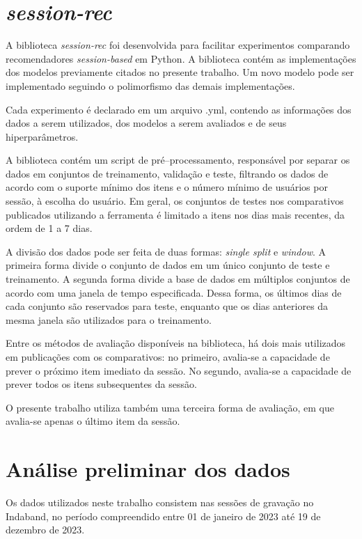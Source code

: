 \section{\textit{session-rec}} A biblioteca \textit{session-rec} foi
desenvolvida para facilitar experimentos comparando recomendadores
\textit{session-based} em Python. A biblioteca contém as implementações dos
modelos previamente citados no presente trabalho. Um novo modelo pode ser
implementado seguindo o polimorfismo das demais implementações.

Cada experimento é declarado em um arquivo .yml, contendo as informações dos
dados a serem utilizados, dos modelos a serem avaliados e de seus hiperparâmetros.

A biblioteca contém um script de pré--processamento, responsável por separar os
dados em conjuntos de treinamento, validação e teste, filtrando os dados de
acordo com o suporte mínimo dos itens e o número mínimo de usuários por sessão,
à escolha do usuário. Em geral, os conjuntos de testes nos comparativos
publicados utilizando a ferramenta é limitado a itens nos dias mais recentes, da
ordem de 1 a 7 dias.

A divisão dos dados pode ser feita de duas formas: \textit{single split} e
\textit{window}. A primeira forma divide o conjunto de dados em um único
conjunto de teste e treinamento. A segunda forma divide a base de dados em
múltiplos conjuntos de acordo com uma janela de tempo especificada. Dessa forma, os
últimos dias de cada conjunto são reservados para teste, enquanto que os dias
anteriores da mesma janela são utilizados para o treinamento.

 Entre os métodos de avaliação disponíveis na biblioteca, há dois mais
 utilizados em publicações com os comparativos: no primeiro, avalia-se a
 capacidade de prever o próximo item imediato da sessão. No segundo, avalia-se a
 capacidade de prever todos os itens subsequentes da sessão.

 O presente trabalho utiliza também uma terceira forma de avaliação, em que
 avalia-se apenas o último item da sessão.

\section{Análise preliminar dos dados}

Os dados utilizados neste trabalho consistem nas sessões de gravação no
Indaband, no período compreendido entre 01 de janeiro de 2023 até 19 de dezembro
de 2023.


